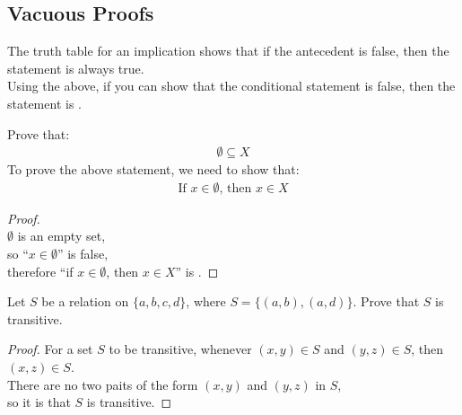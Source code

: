\documentclass[../notes.tex]{subfiles}
\begin{document}
			\subsection{Vacuous Proofs}
				The truth table for an implication shows that if the antecedent is false, then the statement is always true.\\
				Using the above, if you can show that the conditional statement is false, then the statement is .
				\begin{example}
					Prove that:
					\begin{align*}
						\emptyset \subseteq X
					\end{align*}
					To prove the above statement, we need to show that:
						\begin{align*}
							\text{If } x \in \emptyset \text{, then } x \in X
						\end{align*}
					\begin{proof}
						$ $\\
						$\emptyset$ is an empty set,\\
						so ``$x \in \emptyset$'' is false,\\
						therefore ``if $x \in \emptyset$, then $x \in X$'' is . \qedhere
					\end{proof}
				\end{example}
				\begin{example}
					Let $S$ be a relation on $\{a, b, c, d\}$, where $S = \bigl\{(a, b), (a, d)\bigr\}$. Prove that $S$ is transitive.
					\begin{proof} For a set $S$ to be transitive, whenever $(x, y) \in S$ and $(y, z) \in S$, then $(x, z) \in S$.\\
						There are no two paits of the form $(x, y)$ and $(y, z)$ in $S$,\\
						so it is  that $S$ is transitive.
					\end{proof}
				\end{example}
				\vspace*{\parskip}
\end{document}
